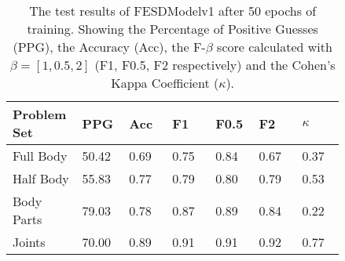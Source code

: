    \begin{table}[!htbp]
        \centering
        \caption[Test Results of FESDModelv1]{The test results of FESDModelv1 after 50 epochs of training. Showing the Percentage of Positive Guesses (PPG), the Accuracy (Acc), the F-$\beta$ score calculated with $\beta = [1, 0.5, 2]$ (F1, F0.5, F2 respectively) and the Cohen's Kappa Coefficient ($\kappa$).}
        \label{tab:res_v1}
        \begin{tabular}{p{0.12\linewidth}p{0.12\linewidth}p{0.12\linewidth}p{0.12\linewidth}p{0.12\linewidth}p{0.12\linewidth}p{0.12\linewidth}}
\hline
Problem Set &   PPG &  Acc &   F1 &  F0.5 &   F2 &  $\kappa$ \\
\hline
Full Body  & 50.42 & 0.69 & 0.75 &  0.84 & 0.67 &      0.37 \\
Half Body  & 55.83 & 0.77 & 0.79 &  0.80 & 0.79 &      0.53 \\
Body Parts & 79.03 & 0.78 & 0.87 &  0.89 & 0.84 &      0.22 \\
Joints     & 70.00 & 0.89 & 0.91 &  0.91 & 0.92 &      0.77 \\
\hline
\end{tabular}

    \end{table}
  